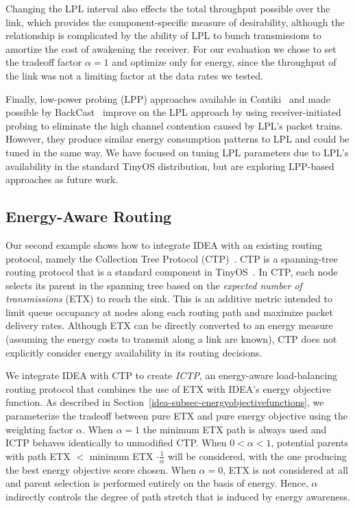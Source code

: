 Changing the LPL interval also effects the total throughput possible over the
link, which provides the component-specific measure of desirability, although
the relationship is complicated by the ability of LPL to bunch transmissions
to amortize the cost of awakening the receiver. For our evaluation we chose
to set the tradeoff factor $\alpha=1$ and optimize only for energy, since the
throughput of the link was not a limiting factor at the data rates we tested.

Finally, low-power probing (LPP) approaches available in
Contiki~\cite{contiki} and made possible by BackCast~\cite{backcast-hotnets}
improve on the LPL approach by using receiver-initiated probing to eliminate
the high channel contention caused by LPL's packet trains. However, they
produce similar energy consumption patterns to LPL and could be tuned in the
same way. We have focused on tuning LPL parameters due to LPL's availability
in the standard TinyOS distribution, but are exploring LPP-based approaches
as future work.

\subsection{Energy-Aware Routing}

Our second example shows how to integrate IDEA with an existing routing
protocol, namely the Collection Tree Protocol (CTP)~\cite{ctp-sensys09}. CTP
is a spanning-tree routing protocol that is a standard component in
TinyOS~\cite{tinyos-asplos00}. In CTP, each node selects its parent in the
spanning tree based on the \textit{expected number of transmissions} (ETX) to
reach the sink. This is an additive metric intended to limit queue occupancy
at nodes along each routing path and maximize packet delivery rates. Although
ETX can be directly converted to an energy measure (assuming the energy costs
to transmit along a link are known), CTP does not explicitly consider energy
availability in its routing decisions.

We integrate IDEA with CTP to create \textit{ICTP}, an energy-aware
load-balancing routing protocol that combines the use of ETX with IDEA's
energy objective function. As described in
Section~\ref{idea-subsec-energyobjectivefunctions}, we parameterize the
tradeoff between pure ETX and pure energy objective using the weighting
factor $\alpha$. When $\alpha = 1$ the minimum ETX path is always used and
ICTP behaves identically to unmodified CTP. When $0 < \alpha < 1$, potential
parents with path ETX $<$ minimum ETX $\cdot \frac{1}{\alpha}$ will be
considered, with the one producing the best energy objective score chosen.
When $\alpha = 0$, ETX is not considered at all and parent selection is
performed entirely on the basis of energy. Hence, $\alpha$ indirectly
controls the degree of path stretch that is induced by energy awareness. 

